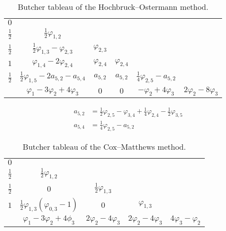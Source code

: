 \begin{subappendices}
\begin{table}[H]
  \centering
  \begin{tabular}{c|ccccc}
    $0$           & \\
    $\frac{1}{2}$ & $\frac{1}{2}\varphi_{1,2}$ \\
    $\frac{1}{2}$ & $\frac{1}{2}\varphi_{1,3}-\varphi_{2,3}$    & $\varphi_{2,3}$ \\
    $1$           & $\varphi_{1,4}-2\varphi_{2,4}$              & $\varphi_{2,4}$ & $\varphi_{2,4}$ \\
    $\frac{1}{2}$ & $\frac{1}{2}\varphi_{1,5}-2a_{5,2}-a_{5,4}$ & $a_{5,2}$       & $a_{5,2}$       & $\frac{1}{4}\varphi_{2,5} - a_{5,2}$ \\
    \hline
    & $\varphi_1-3\varphi_2+4\varphi_3$ & $0$ & $0$ & $-\varphi_2+4\varphi_3$ & $2\varphi_2-8\varphi_3$ \\
  \end{tabular}

    $$\begin{aligned} a_{5,2} &= \frac{1}{2}\varphi_{2,5}-\varphi_{3,4}+\frac{1}{4}\varphi_{2,4}-\frac{1}{2}\varphi_{3,5} \\ a_{5,4} &= \frac{1}{4}\varphi_{2,5}-a_{5,2} \end{aligned}
  $$
  \caption{Butcher tableau of the Hochbruck--Ostermann method.}
  \label{butcherHO}
\end{table}

\begin{table}[H]
  \centering
  \begin{tabular}{c|cccc}
    $0$           & \\
    $\frac{1}{2}$ & $\frac{1}{2}\varphi_{1,2}$ \\
    $\frac{1}{2}$ & $0$                        & $\frac{1}{2}\varphi_{1,3}$ \\
    $1$           & $\frac{1}{2}\varphi_{1,3}(\varphi_{0,3}-1)$ & $0$ & $\varphi_{1,3}$ \\
    \hline
    & $\varphi_1-3\varphi_2+4\phi_3$ & $2\varphi_2-4\varphi_3$ & $2\varphi_2-4\varphi_3$ & $4\varphi_3-\varphi_2$ \\
  \end{tabular}
  \caption{Butcher tableau of the Cox--Matthews method.}
    \label{butcherCM}
\end{table}



\end{subappendices}
